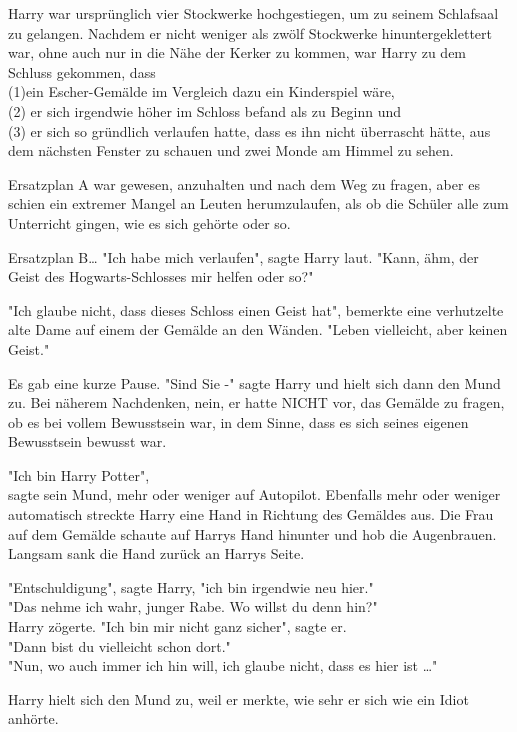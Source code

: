 {Harry war ursprünglich vier Stockwerke hochgestiegen, um zu seinem Schlafsaal zu gelangen. Nachdem er nicht weniger als zwölf Stockwerke hinuntergeklettert war, ohne auch nur in die Nähe der Kerker zu kommen, war Harry zu dem Schluss gekommen, dass\\ (1)ein Escher-Gemälde im Vergleich dazu ein Kinderspiel wäre,\\ (2) er sich irgendwie höher im Schloss befand als zu Beginn und\\ (3) er sich so gründlich verlaufen hatte, dass es ihn nicht überrascht hätte, aus dem nächsten Fenster zu schauen und zwei Monde am Himmel zu sehen.

Ersatzplan A war gewesen, anzuhalten und nach dem Weg zu fragen, aber es schien ein extremer Mangel an Leuten herumzulaufen, als ob die Schüler alle zum Unterricht gingen, wie es sich gehörte oder so.

Ersatzplan B… "Ich habe mich verlaufen", sagte Harry laut. "Kann, ähm, der Geist des Hogwarts-Schlosses mir helfen oder so?"

"Ich glaube nicht, dass dieses Schloss einen Geist hat", bemerkte eine verhutzelte alte Dame auf einem der Gemälde an den Wänden. "Leben vielleicht, aber keinen Geist."

Es gab eine kurze Pause. "Sind Sie -" sagte Harry und hielt sich dann den Mund zu. Bei näherem Nachdenken, nein, er hatte NICHT vor, das Gemälde zu fragen, ob es bei vollem Bewusstsein war, in dem Sinne, dass es sich seines eigenen Bewusstsein bewusst war.

"Ich bin Harry Potter",\\ sagte sein Mund, mehr oder weniger auf Autopilot. Ebenfalls mehr oder weniger automatisch streckte Harry eine Hand in Richtung des Gemäldes aus. Die Frau auf dem Gemälde schaute auf Harrys Hand hinunter und hob die Augenbrauen. Langsam sank die Hand zurück an Harrys Seite.

"Entschuldigung", sagte Harry, "ich bin irgendwie neu hier."\\ "Das nehme ich wahr, junger Rabe. Wo willst du denn hin?"\\ Harry zögerte. "Ich bin mir nicht ganz sicher", sagte er.\\ "Dann bist du vielleicht schon dort."\\ "Nun, wo auch immer ich hin will, ich glaube nicht, dass es hier ist …"

Harry hielt sich den Mund zu, weil er merkte, wie sehr er sich wie ein Idiot anhörte.

}
